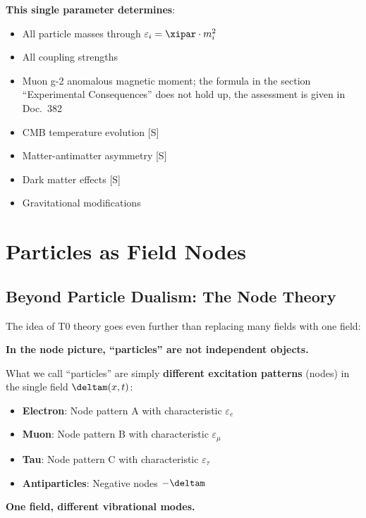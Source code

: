 	\textbf{This single parameter determines}:
	\begin{itemize}
		\item All particle masses through $\varepsilon_i = \xipar \cdot m_i^2$
		\item All coupling strengths
		\item Muon g-2 anomalous magnetic moment; the formula in the section \enquote{Experimental Consequences} does not hold up, the assessment is given in Doc.~382
		\item CMB temperature evolution [S]
		\item Matter-antimatter asymmetry [S]
		\item Dark matter effects [S]
		\item Gravitational modifications
	\end{itemize}
	
	\section{Particles as Field Nodes}
	
	\subsection{Beyond Particle Dualism: The Node Theory}
	
	The idea of T0 theory goes even further than replacing many fields with one field:
	
	\begin{tcolorbox}[colback=purple!5!white,colframe=purple!75!black,title=Node Picture: No Separate Particles]
		\textbf{In the node picture, ``particles'' are not independent objects.}
		
		What we call ``particles'' are simply \textbf{different excitation patterns} (nodes) in the single field $\deltam(x,t)$:
		
		\begin{itemize}
			\item \textbf{Electron}: Node pattern A with characteristic $\varepsilon_e$
			\item \textbf{Muon}: Node pattern B with characteristic $\varepsilon_{\mu}$
			\item \textbf{Tau}: Node pattern C with characteristic $\varepsilon_{\tau}$
			\item \textbf{Antiparticles}: Negative nodes $-\deltam$
		\end{itemize}
		
		\textbf{One field, different vibrational modes.}
	\end{tcolorbox}
	
